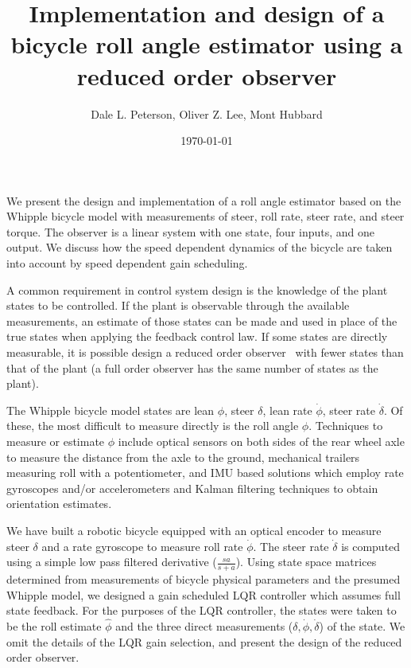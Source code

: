 \documentclass[letterpaper,11pt]{article}
\begin{document}
\title{Implementation and design of a bicycle roll angle estimator using a reduced order observer}
\author{Dale L. Peterson, Oliver Z. Lee, Mont Hubbard}
\date{\today}
\maketitle

We present the design and implementation of a roll angle estimator based on the
Whipple bicycle model with measurements of steer, roll rate,
steer rate, and steer torque.  The observer is a
linear system with one state, four inputs, and one output.  We discuss how the
speed dependent dynamics of the bicycle are taken into account by speed
dependent gain scheduling.

A common requirement in control system design is the knowledge of the plant
states to be controlled. If the plant is observable through the available
measurements, an estimate of those states can be made and used in place of the
true states when applying the feedback control law. If some states are
directly measurable, it is possible design a reduced order
observer~\citep{Bryson1970} with fewer states than that of the plant (a
full order observer has the same number of states as the plant).

The Whipple bicycle model states are lean $\phi$, steer $\delta$, lean
rate $\dot{\phi}$, steer rate $\dot{\delta}$.  Of these, the most
difficult to measure directly is the roll angle $\phi$. Techniques to measure
or estimate $\phi$ include optical sensors on both sides of the rear wheel axle to
measure the distance from the axle to the ground, mechanical trailers measuring
roll with a potentiometer, and IMU based solutions which employ rate
gyroscopes and/or accelerometers and Kalman filtering techniques to obtain
orientation estimates\cite{Boniolo2008}.

We have built a robotic bicycle equipped with an optical encoder to measure
steer $\delta$ and a rate gyroscope to measure roll rate $\dot{\phi}$.  The steer
rate $\dot{\delta}$ is computed using a simple low pass filtered derivative
($\frac{sa}{s+a}$). Using state space matrices determined from measurements
of bicycle physical parameters and the presumed Whipple model, we designed a
gain scheduled LQR controller which assumes full state feedback.  For the
purposes of the LQR controller, the states were taken to be the roll estimate
$\hat{\phi}$ and the three direct measurements ($\delta, \dot{\phi},
\dot{\delta}$) of the state.  We omit the details of the LQR gain selection,
and present the design of the reduced order observer.
\end{document}
